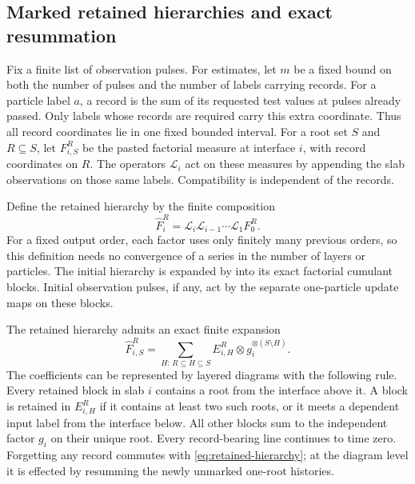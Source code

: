 \subsection{Marked retained hierarchies and exact resummation}

Fix a finite list of observation pulses.  For estimates, let $m$ be a
fixed bound on both the number of pulses and the number of labels
carrying records.  For a particle label $a$, a
record is the sum of its requested test values at pulses already passed.
Only labels whose records are required carry this extra coordinate.
Thus all record coordinates lie in one fixed bounded interval.  For a
root set $S$ and $R\subseteq S$, let $F^R_{i,S}$ be the pasted factorial
measure at interface $i$, with record coordinates on $R$.  The operators
$\mathcal L_i$ act on these measures by appending the slab observations
on those same labels.  Compatibility is independent of the records.

Define the retained hierarchy by the finite composition
\begin{equation}\label{eq:retained-hierarchy}
 \widehat F^R_i=\mathcal L_i\mathcal L_{i-1}\cdots\mathcal L_1F^R_0.
\end{equation}
For a fixed output order, each factor uses only finitely many previous
orders, so this definition needs no convergence of a series in the
number of layers or particles.  The initial hierarchy is expanded by
 into its exact factorial cumulant blocks.  Initial
observation pulses, if any, act by the separate one-particle update maps
on these blocks.

\begin{lemma}
\label{lem:marked-regrouping}
The retained hierarchy admits an exact finite expansion
\begin{equation}\label{eq:dependent-subsets}
 \widehat F^R_{i,S}
   =\sum_{H:\,R\subseteq H\subseteq S}
        E^R_{i,H}\otimes g_i^{\otimes(S\setminus H)}.
\end{equation}
The coefficients can be represented by layered diagrams with the
following rule.  Every retained block in slab $i$ contains a root from
the interface above it.  A block is retained in $E^R_{i,H}$ if it
contains at least two such roots, or it meets a dependent input label
from the interface below.  All other blocks sum to the independent
factor $g_i$ on their unique root.  Every record-bearing line continues
to time zero.  Forgetting any record commutes with
\eqref{eq:retained-hierarchy}; at the diagram level it is effected by
resumming the newly unmarked one-root histories.
\end{lemma}

